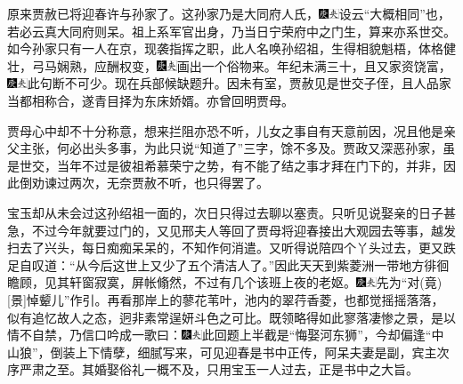原来贾赦已将迎春许与孙家了。这孙家乃是大同府人氏，{\includegraphics[width=3mm]{../Images/00004}\includegraphics[width=3mm]{../Images/00012}\footnotesize \kaishu 设云``大概相同''也，若必云真大同府则呆。}祖上系军官出身，乃当日宁荣府中之门生，算来亦系世交。如今孙家只有一人在京，现袭指挥之职，此人名唤孙绍祖，生得相貌魁梧，体格健壮，弓马娴熟，应酬权变，{\includegraphics[width=3mm]{../Images/00004}\includegraphics[width=3mm]{../Images/00012}\footnotesize \kaishu 画出一个俗物来。}年纪未满三十，且又家资饶富，{\includegraphics[width=3mm]{../Images/00004}\includegraphics[width=3mm]{../Images/00012}\footnotesize \kaishu 此句断不可少。}现在兵部候缺题升。因未有室，贾赦见是世交子侄，且人品家当都相称合，遂青目择为东床娇婿。亦曾回明贾母。

贾母心中却不十分称意，想来拦阻亦恐不听，儿女之事自有天意前因，况且他是亲父主张，何必出头多事，为此只说``知道了''三字，馀不多及。贾政又深恶孙家，虽是世交，当年不过是彼祖希慕荣宁之势，有不能了结之事才拜在门下的，并非，因此倒劝谏过两次，无奈贾赦不听，也只得罢了。

宝玉却从未会过这孙绍祖一面的，次日只得过去聊以塞责。只听见说娶亲的日子甚急，不过今年就要过门的，又见邢夫人等回了贾母将迎春接出大观园去等事，越发扫去了兴头，每日痴痴呆呆的，不知作何消遣。又听得说陪四个丫头过去，更又跌足自叹道：``从今后这世上又少了五个清洁人了。''因此天天到紫菱洲一带地方徘徊瞻顾，见其轩窗寂寞，屏帐翛然，不过有几个该班上夜的老妪。{\includegraphics[width=3mm]{../Images/00004}\includegraphics[width=3mm]{../Images/00012}\footnotesize \kaishu 先为``对{(竟)}{[}景{]}悼颦儿''作引。}再看那岸上的蓼花苇叶，池内的翠荇香菱，也都觉摇摇落落，似有追忆故人之态，迥非素常逞妍斗色之可比。既领略得如此寥落凄惨之景，是以情不自禁，乃信口吟成一歌曰：{\includegraphics[width=3mm]{../Images/00004}\includegraphics[width=3mm]{../Images/00012}\footnotesize \kaishu 此回题上半截是``悔娶河东狮''，今却偏逢``中山狼''，倒装上下情孽，细腻写来，可见迎春是书中正传，阿呆夫妻是副，宾主次序严肃之至。其婚娶俗礼一概不及，只用宝玉一人过去，正是书中之大旨。}

